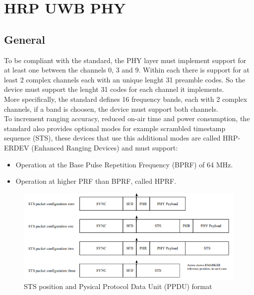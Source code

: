 \documentclass[conference]{IEEEtran}
\begin{document}
\section{HRP UWB PHY}
\subsection{General}
To be compliant with the standard\cite{10794632}, the PHY layer must implement support for at least one
between the channels 0, 3 and 9. Within each there is support for at least 2 complex channels
each with an unique lenght 31 preamble codes. So the device must support the lenght 31 codes for
each channel it implements.\\
More specifically, the standard\cite{10794632} defines 16 frequency bands, each with 2 complex channels,
if a band is choosen, the device must support both channels.\\

To increment ranging accuracy, reduced on-air time and power consumption, the standard\cite{10794632}
also provides optional modes for example scrambled timestamp sequence (STS), these devices
that use this additional modes are called HRP-ERDEV (Enhanced Ranging Devices) and must
support:
\begin{itemize}
  \item Operation at the Base Pulse Repetition Frequency (BPRF) of 64 MHz.
  \item Operation at higher PRF than BPRF, called HPRF.
\end{itemize}

\begin{figure}[!h]
  \centering
  \includegraphics[width=\linewidth]{STS-pak}
  \caption{STS position and Pysical Protocol Data Unit (PPDU) format}
  \label{fig:STS}
\end{figure}
\end{document}
